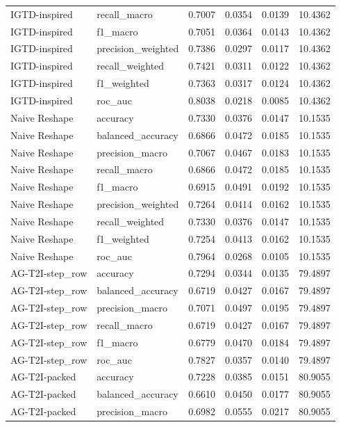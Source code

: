 \begin{tabular}{llrrrr}
IGTD-inspired & recall_macro & 0.7007 & 0.0354 & 0.0139 & 10.4362 \\
IGTD-inspired & f1_macro & 0.7051 & 0.0364 & 0.0143 & 10.4362 \\
IGTD-inspired & precision_weighted & 0.7386 & 0.0297 & 0.0117 & 10.4362 \\
IGTD-inspired & recall_weighted & 0.7421 & 0.0311 & 0.0122 & 10.4362 \\
IGTD-inspired & f1_weighted & 0.7363 & 0.0317 & 0.0124 & 10.4362 \\
IGTD-inspired & roc_auc & 0.8038 & 0.0218 & 0.0085 & 10.4362 \\
Naive Reshape & accuracy & 0.7330 & 0.0376 & 0.0147 & 10.1535 \\
Naive Reshape & balanced_accuracy & 0.6866 & 0.0472 & 0.0185 & 10.1535 \\
Naive Reshape & precision_macro & 0.7067 & 0.0467 & 0.0183 & 10.1535 \\
Naive Reshape & recall_macro & 0.6866 & 0.0472 & 0.0185 & 10.1535 \\
Naive Reshape & f1_macro & 0.6915 & 0.0491 & 0.0192 & 10.1535 \\
Naive Reshape & precision_weighted & 0.7264 & 0.0414 & 0.0162 & 10.1535 \\
Naive Reshape & recall_weighted & 0.7330 & 0.0376 & 0.0147 & 10.1535 \\
Naive Reshape & f1_weighted & 0.7254 & 0.0413 & 0.0162 & 10.1535 \\
Naive Reshape & roc_auc & 0.7964 & 0.0268 & 0.0105 & 10.1535 \\
AG-T2I-step_row & accuracy & 0.7294 & 0.0344 & 0.0135 & 79.4897 \\
AG-T2I-step_row & balanced_accuracy & 0.6719 & 0.0427 & 0.0167 & 79.4897 \\
AG-T2I-step_row & precision_macro & 0.7071 & 0.0497 & 0.0195 & 79.4897 \\
AG-T2I-step_row & recall_macro & 0.6719 & 0.0427 & 0.0167 & 79.4897 \\
AG-T2I-step_row & f1_macro & 0.6779 & 0.0470 & 0.0184 & 79.4897 \\
AG-T2I-step_row & roc_auc & 0.7827 & 0.0357 & 0.0140 & 79.4897 \\
AG-T2I-packed & accuracy & 0.7228 & 0.0385 & 0.0151 & 80.9055 \\
AG-T2I-packed & balanced_accuracy & 0.6610 & 0.0450 & 0.0177 & 80.9055 \\
AG-T2I-packed & precision_macro & 0.6982 & 0.0555 & 0.0217 & 80.9055 \\

\end{tabular}
